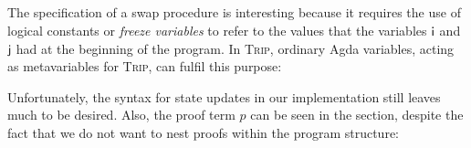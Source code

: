 \documentclass[sigplan]{acmart}%
\begin{document}
\begin{code}
\>[2]\AgdaSpace{}%
\AgdaSpace{}%
\AgdaSymbol{:}\AgdaSpace{}%
\AgdaSpace{}%
\<%
\\
\>[2][@{}l@{\AgdaIndent{0}}]%
\>[4]\<%
\\
\>[4][@{}l@{\AgdaIndent{0}}]%
\>[6]\AgdaSpace{}%
\AgdaSymbol{:}\AgdaSpace{}%
\<%
\\
%
\>[6]\AgdaSpace{}%
\AgdaSymbol{:}\AgdaSpace{}%
\<%
\\
%
\>[6]\AgdaSpace{}%
\AgdaSymbol{:}\AgdaSpace{}%
\<%
\end{code}
The specification of a swap procedure is interesting because it requires the 
use of logical constants or \emph{freeze variables} to refer to the values that the 
variables $\AgdaField{i}$ and $\AgdaField{j}$ had at the beginning of the 
program. In \textsc{Trip}, ordinary Agda variables, acting as metavariables for 
\textsc{Trip}, can fulfil this purpose:
\begin{code}
\>[2]\AgdaSpace{}%
\AgdaSymbol{:}\AgdaSpace{}%
\AgdaSpace{}%
\AgdaSpace{}%
\AgdaSymbol{:}\AgdaSpace{}%
\AgdaSymbol{\}}\AgdaSpace{}%
\AgdaSpace{}%
\AgdaOperator{\AgdaDatatype{[}}\AgdaSpace{}%
\AgdaSpace{}%
\AgdaSpace{}%
\AgdaSpace{}%
\AgdaSpace{}%
\AgdaSpace{}%
\AgdaSpace{}%
\AgdaSpace{}%
\AgdaOperator{\AgdaDatatype{,}}\AgdaSpace{}%
\AgdaSpace{}%
\AgdaSpace{}%
\AgdaSpace{}%
\AgdaSpace{}%
\AgdaSpace{}%
\AgdaSpace{}%
\AgdaSpace{}%
\AgdaOperator{\AgdaDatatype{]}}\<%
\end{code}
Unfortunately, the syntax for state updates in our implementation still leaves much to be 
desired.
 Also, the 
proof term $p$ can be seen in the  section, despite 
the fact that we do not want to nest proofs within the program structure:
\end{document}
